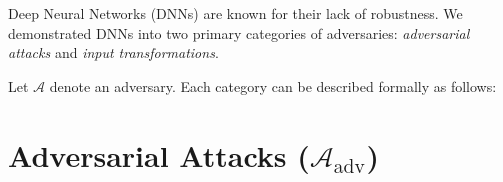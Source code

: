 \documentclass[10pt, conference, a4paper, final]{IEEEtran}
\begin{document}

Deep Neural Networks (DNNs) are known for their lack of robustness. We demonstrated  DNNs into two primary categories of adversaries: \emph{adversarial attacks} and \emph{input transformations}.

Let \( \mathcal{A} \) denote an adversary. Each category can be described formally as follows:

\section*{Adversarial Attacks (\( \mathcal{A}_{\text{adv}} \))}
\end{document}
